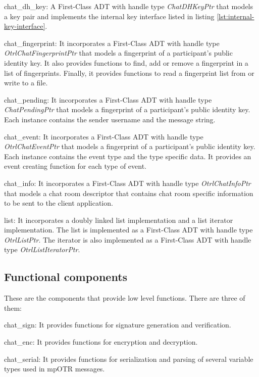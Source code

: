 \begin{description}
  \item chat\_dh\_key: A First-Class ADT with handle type \emph{ChatDHKeyPtr} that models a \dhname key pair and implements the internal key interface listed in listing \ref{lst:internal-key-interface}.

  \item chat\_fingerprint: It incorporates a First-Class ADT with handle type \emph{OtrlChatFingerprintPtr} that models a fingerprint of a participant's public identity key. It also provides functions to find, add or remove a fingerprint in a list of fingerprints. Finally, it provides functions to read a fingerprint list from or write to a file.

  \item chat\_pending: It incorporates a First-Class ADT with handle type \emph{ChatPendingPtr} that models a fingerprint of a participant's public identity key. Each instance contains the sender username and the message string.
  
  \item chat\_event: It incorporates a First-Class ADT with handle type \emph{OtrlChatEventPtr} that models a fingerprint of a participant's public identity key. Each instance contains the event type and the type specific data. It provides an event creating function for each type of event.

  \item chat\_info:  It incorporates a First-Class ADT with handle type \emph{OtrlChatInfoPtr} that models a chat room descriptor that contains chat room specific information to be sent to the client application.
  
  \item{list}: It incorporates a doubly linked list implementation and a list iterator implementation. The list is implemented as a First-Class ADT with handle type \emph{OtrlListPtr}. The iterator is also implemented as a First-Class ADT with handle type \emph{OtrlListIteratorPtr}.
\end{description}


\subsection{Functional components}
These are the components that provide low level functions. There are three of them:

\begin{description}
  \item chat\_sign: It provides functions for signature generation and verification.

  \item chat\_enc: It provides functions for encryption and decryption.

  \item chat\_serial: It provides functions for serialization and parsing of several variable types used in mpOTR messages. 
\end{description}

